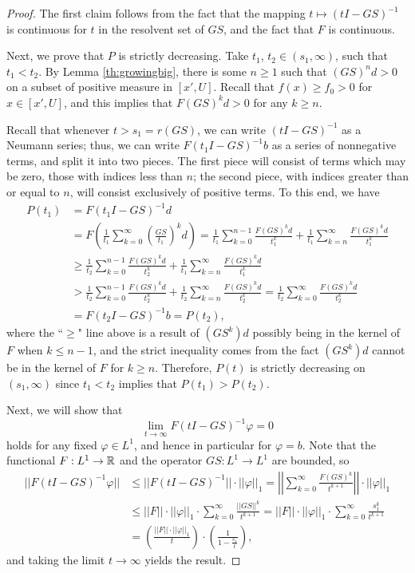\begin{proof}
	The first claim follows from the fact that the mapping $t \mapsto (t I-GS)^{-1}$ is continuous for $t$ in the resolvent set of $GS$, and the fact that $F$ is continuous.
	
	Next, we prove that $P$ is strictly decreasing. Take $t_1$, $t_2 \in (s_1, \infty)$, such that $t_1 < t_2$. By Lemma \ref{th:growingbig}, there is some $n \geq 1$ such that $(GS)^n d>0$ on a subset of positive measure in $[x',U]$. Recall that $f(x) \geq f_0 >0$ for $x \in [x',U]$, and this implies that $F(GS)^k d>0$ for any $k \geq n$. 
	
	Recall that whenever $t>s_1 = r(GS)$, we can write $(t I-GS)^{-1}$ as a Neumann series; thus, we can write $F(t_1 I - GS)^{-1}b$ as a series of nonnegative terms, and split it into two pieces. The first piece will consist of terms which may be zero, those with indices less than $n$; the second piece, with indices greater than or equal to $n$, will consist exclusively of positive terms. To this end, we have
	\begin{align*}
		P(t_1) &= F(t_1 I - GS)^{-1} d \\
		&= F \left( \frac{1}{t_1} \sum_{k=0}^\infty \left( \frac{GS}{t_1} \right)^k d \right) = \frac{1}{t_1} \sum_{k=0}^{n-1} \frac{F(GS)^kd}{t_1^k} + \frac{1}{t_1} \sum_{k=n}^\infty \frac{F(GS)^kd}{t_1^k} \\
		&\geq \frac{1}{t_2} \sum_{k=0}^{n-1} \frac{F(GS)^kd}{t_2^k} + \frac{1}{t_1} \sum_{k=n}^\infty \frac{F(GS)^kd}{t_1^k} \\
		&> \frac{1}{t_2} \sum_{k=0}^{n-1} \frac{F(GS)^kd}{t_2^k} + \frac{1}{t_2} \sum_{k=n}^\infty \frac{F(GS)^kd}{t_2^k} = \frac{1}{t_2} \sum_{k=0}^\infty \frac{F(GS)^kd}{t_2^k} \\
		&=F(t_2I-GS)^{-1}b =P(t_2),
	\end{align*}
	where the ``$\geq$" line above is a result of $(GS^k) d$ possibly being in the kernel of $F$ when $k \leq n-1$, and the strict inequality comes from the fact $(GS^k)d$ cannot be in the kernel of $F$ for $k \geq n$. Therefore, $P(t)$ is strictly decreasing on $(s_1, \infty)$ since $t_1 < t_2$ implies that $P(t_1) > P(t_2)$.
	
	Next, we will show that 
	\[\lim_{t \to \infty} F(t I - GS)^{-1} \varphi = 0 \]
	holds for any fixed $\varphi \in L^1$, and hence in particular for $\varphi = b$. Note that the functional $F:L^1 \to \mathbb{R}$ and the operator $GS:L^1 \to L^1$ are bounded, so
	\begin{align*}
		||F(t I - GS)^{-1} \varphi|| &\leq ||F(t I -GS)^{-1}|| \cdot ||\varphi||_1 = \left|\left| \sum_{k=0}^\infty \frac{F(GS)^k}{t^{k+1}} \right| \right| \cdot ||\varphi||_1 \\
		&\leq ||F|| \cdot ||\varphi||_1 \cdot \sum_{k=0}^\infty \frac{||GS||^k}{t^{k+1}} =||F|| \cdot ||\varphi||_1 \cdot \sum_{k=0}^\infty \frac{s_1^k}{t^{k+1}} \\
		&=\left(\frac{||F|| \cdot ||\varphi||_1}{t} \right) \cdot \left( \frac{1}{1-\frac{s_1}{t}} \right),
	\end{align*}
	and taking the limit $t \to \infty$ yields the result.
	

\end{proof}
